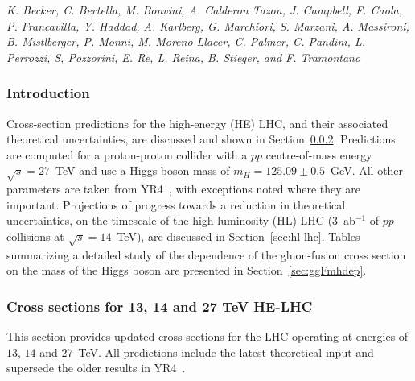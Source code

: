\begin{center}{\it K. Becker,
C. Bertella,
M. Bonvini,
A. Calderon Tazon,
J. Campbell,
F. Caola,
P. Francavilla,
Y. Haddad,
A. Karlberg,
G. Marchiori,
S. Marzani,
A. Massironi,
B. Mistlberger,
P. Monni,
M. Moreno Llacer,
C. Palmer,
C. Pandini,
L. Perrozzi,
S, Pozzorini,
E. Re,
L. Reina,
B. Stieger,
and
F. Tramontano} \end{center}

 
\subsubsection{Introduction}

Cross-section predictions for the high-energy (HE) LHC, and their associated theoretical uncertainties, are discussed and shown in
Section~\ref{sec:he-lhc}. Predictions are computed for a proton-proton collider with a $pp$ centre-of-mass
energy $\sqrt{s}=27$~TeV and use a Higgs
boson mass of $m_H=125.09 \pm 0.5$~GeV.   All other parameters are taken from YR4~\cite{deFlorian:2016spz},
with exceptions noted where they are important.  
Projections of progress towards a reduction in theoretical uncertainties, on the timescale
of the high-luminosity (HL) LHC (3~ab$^{-1}$ of $pp$ collisions at $\sqrt{s}=14$~TeV), are discussed in Section~\ref{sec:hl-lhc}. 
Tables summarizing a detailed study of the dependence of the gluon-fusion cross section on the mass of the Higgs boson
are presented in Section~\ref{sec:ggFmhdep}.

\subsubsection{Cross sections for 13, 14 and 27 TeV HE-LHC}
\label{sec:he-lhc}

This section provides updated cross-sections for the LHC operating at
energies of $13$, $14$ and $27$~TeV.  All predictions include the latest 
theoretical input and supersede the older results in YR4~\cite{deFlorian:2016spz}.

